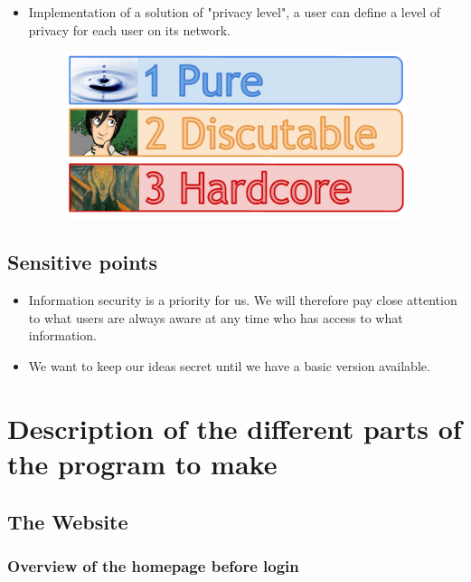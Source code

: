 \documentclass{life-fr}
\begin{document}
\begin{itemize}
  \item Implementation of a solution of "privacy level", a user can define a level of privacy for each user on its network.

\begin{figure}[H]
  \begin{center}
    \includegraphics[width=10cm]{img/confidentialite.png}
  \end{center}
\end{figure}

\end{itemize}

\section{Sensitive points}

\begin{itemize}
  \item Information security is a priority for us. We will therefore pay close attention to what users are always aware at any time who has access to what information.
  \item We want to keep our ideas secret until we have a basic version available.
\end{itemize}

\chapter{Description of the different parts of the program to make}

\section{The Website}

\subsection{Overview of the homepage before login}
\end{document}
